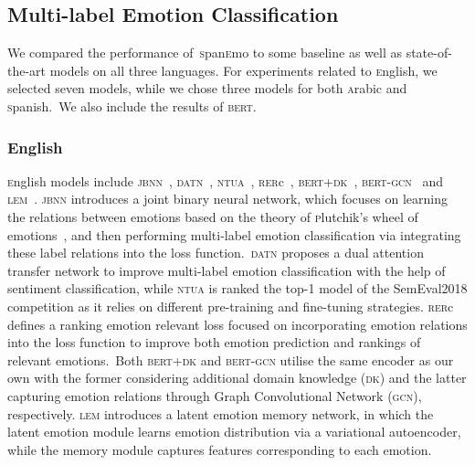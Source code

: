 \documentclass[11pt,a4paper]{article}
\begin{document}
\subsection{Multi-label Emotion Classification}\label{bl}
We compared the performance of~\textsc{s}pan\textsc{e}mo to some baseline as well as state-of-the-art models on all three languages. For experiments related to \textsc{e}nglish, we selected seven models, while we chose three models for both \textsc{a}rabic and \textsc{s}panish.~We also include the results of \textsc{bert}.

\subsubsection{English}
\textsc{e}nglish models include
\textsc{jbnn}~\cite{he2018joint}, \textsc{datn}~\cite{yu2018improving}, \textsc{ntua}~\cite{baziotis2018ntua}, \textsc{rer}c~\cite{zhou2018relevant}, \textsc{bert}+\textsc{dk}~\cite{ying-etal-2019-improving}, \textsc{bert-gcn}~\cite{xu2020emograph} and \textsc{lem}~\cite{fei2020latent}. \textsc{jbnn} introduces a joint binary neural network, which focuses on learning the relations between emotions based on the theory of \textsc{p}lutchik’s wheel of emotions~\cite{plutchik1980emotion}, and then performing multi-label emotion classification via integrating these label relations into the loss function.~\textsc{datn} proposes a dual attention transfer network to improve multi-label emotion classification with the help of sentiment classification, while \textsc{ntua} is ranked the top-1 model of the SemEval2018 competition as it relies on different pre-training and fine-tuning strategies. \textsc{rer}c defines a ranking emotion relevant loss focused on incorporating emotion relations into the loss function to improve both emotion prediction and rankings of relevant emotions.~Both \textsc{bert}+\textsc{dk} and \textsc{bert-gcn} utilise the same encoder as our own with the former considering additional domain knowledge (\textsc{dk}) and the latter capturing emotion relations through Graph Convolutional Network (\textsc{gcn}), respectively. \textsc{lem} introduces a latent emotion memory network, in which the latent emotion module learns emotion distribution via a variational autoencoder, while the memory module captures features corresponding to each emotion.
\end{document}
